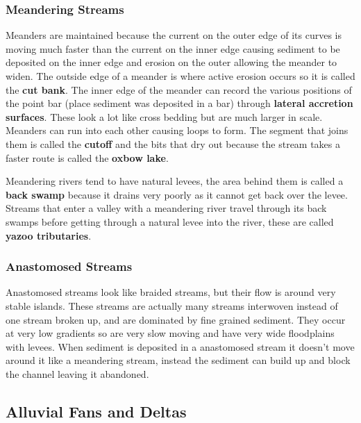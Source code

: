 \documentclass{article}
\begin{document}
\subsubsection{Meandering Streams} %
\label{ssub:meandering_streams}
Meanders are maintained because the current on the outer edge of its curves is moving much faster than the current on the inner edge causing sediment to be deposited on the inner edge and erosion on the outer allowing the meander to widen. The outside edge of a meander is where active erosion occurs so it is called the \textbf{cut bank}. The inner edge of the meander can record the various positions of the point bar (place sediment was deposited in a bar) through \textbf{lateral accretion surfaces}. These look a lot like cross bedding but are much larger in scale. Meanders can run into each other causing loops to form. The segment that joins them is called the \textbf{cutoff} and the bits that dry out because the stream takes a faster route is called the \textbf{oxbow lake}.

Meandering rivers tend to have natural levees, the area behind them is called a \textbf{back swamp} because it drains very poorly as it cannot get back over the levee. Streams that enter a valley with a meandering river travel through its back swamps before getting through a natural levee into the river, these are called \textbf{yazoo tributaries}.

\subsubsection{Anastomosed Streams} %
\label{ssub:anastomosed_streams}
Anastomosed streams look like braided streams, but their flow is around very stable islands. These streams are actually many streams interwoven instead of one stream broken up, and are dominated by fine grained sediment. They occur at very low gradients so are very slow moving and have very wide floodplains with levees. When sediment is deposited in a anastomosed stream it doesn't move around it like a meandering stream, instead the sediment can build up and block the channel leaving it abandoned.

\subsection{Alluvial Fans and Deltas} %
\label{sub:alluvial_fans_and_deltas}
\end{document}
